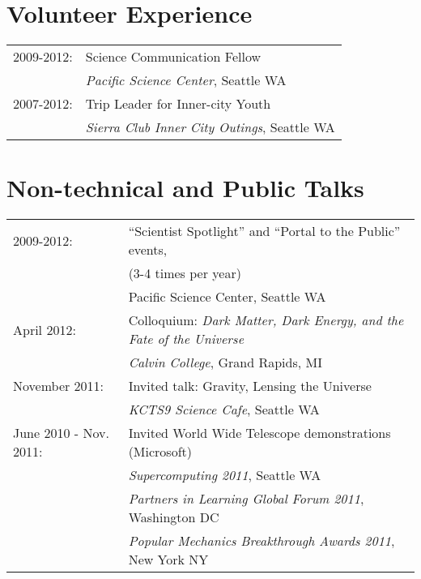 {\section*{Volunteer Experience}
\begin{tabular}{ll}
   2009-2012: & Science Communication Fellow\\
              & \hspace{1cm} {\it Pacific Science Center}, Seattle WA\\
   2007-2012: & Trip Leader for Inner-city Youth\\
              & \hspace{1cm} {\it Sierra Club Inner City Outings}, Seattle WA
\end{tabular}

\section*{Non-technical and Public Talks}
\begin{tabular}{ll}
  2009-2012:     & ``Scientist Spotlight'' and ``Portal to the Public''
                    events,\\ & (3-4 times per year)\\
                 & \hspace{1cm} Pacific Science Center, Seattle WA\\
  April 2012:    & Colloquium: {\it Dark Matter, Dark Energy,
                    and the Fate of the Universe}\\
                 & \hspace{1cm} {\it Calvin College}, Grand Rapids, MI\\
  November 2011: & Invited talk: Gravity, Lensing the Universe\\
                 & \hspace{1cm}  {\it KCTS9 Science Cafe}, Seattle WA\\
  June 2010 - Nov. 2011: & Invited World Wide Telescope demonstrations
                           (Microsoft)\\
                 & \hspace{1cm} {\it Supercomputing 2011}, Seattle WA\\
                 & \hspace{1cm} {\it Partners in Learning Global Forum 2011},
                    Washington DC\\
                 & \hspace{1cm} {\it Popular Mechanics Breakthrough Awards
                    2011}, New York NY\\

\end{tabular}}
